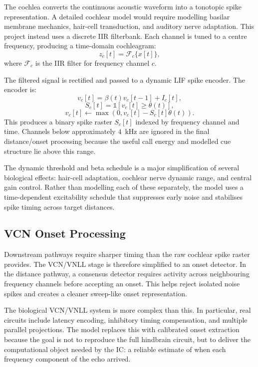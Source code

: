 The cochlea converts the continuous acoustic waveform into a tonotopic spike representation. A detailed cochlear model would require modelling basilar membrane mechanics, hair-cell transduction, and auditory nerve adaptation. This project instead uses a discrete IIR filterbank. Each channel is tuned to a centre frequency, producing a time-domain cochleagram:
\begin{equation}
    z_c[t] = \mathcal{F}_c\{x[t]\},
\end{equation}
where $\mathcal{F}_c$ is the IIR filter for frequency channel $c$.

The filtered signal is rectified and passed to a dynamic LIF spike encoder. The encoder is:
\begin{equation}
    v_c[t] = \beta(t)v_c[t-1] + I_c[t],
\end{equation}
\begin{equation}
    S_c[t] = \mathbb{1}\left[v_c[t] \geq \theta(t)\right],
\end{equation}
\begin{equation}
    v_c[t] \leftarrow \max(0, v_c[t] - S_c[t]\theta(t)).
\end{equation}
This produces a binary spike raster $S_c[t]$ indexed by frequency channel and time. Channels below approximately $4$~kHz are ignored in the final distance/onset processing because the useful call energy and modelled cue structure lie above this range.

The dynamic threshold and beta schedule is a major simplification of several biological effects: hair-cell adaptation, cochlear nerve dynamic range, and central gain control. Rather than modelling each of these separately, the model uses a time-dependent excitability schedule that suppresses early noise and stabilises spike timing across target distances.



\subsection{VCN Onset Processing}

Downstream pathways require sharper timing than the raw cochlear spike raster provides. The VCN/VNLL stage is therefore simplified to an onset detector. In the distance pathway, a consensus detector requires activity across neighbouring frequency channels before accepting an onset. This helps reject isolated noise spikes and creates a cleaner sweep-like onset representation.

The biological VCN/VNLL system is more complex than this. In particular, real circuits include latency encoding, inhibitory timing compensation, and multiple parallel projections. The model replaces this with calibrated onset extraction because the goal is not to reproduce the full hindbrain circuit, but to deliver the computational object needed by the IC: a reliable estimate of when each frequency component of the echo arrived.

